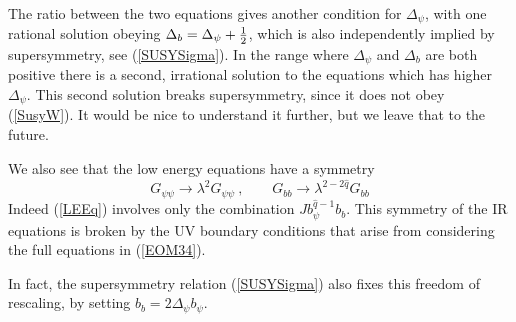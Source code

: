 \documentclass[aps,pre,preprint,onecolumn,citeautoscript,superscriptaddress,nofootinbib,eqsecnum]{revtex4-1}
\def\nref#1{(\ref{#1})}
\def\be{\begin{equation}}
\def\ee{\end{equation}}
\def\half{{1 \over 2 }}
\def\la{\label}
\begin{document}
The ratio between the two equations gives another condition for $\Delta_\psi$, with one rational
solution obeying $\Delta_b = \Delta_\psi + \half $, which is also independently implied by supersymmetry, see  \nref{SUSYSigma}. 
In the range where $\Delta_\psi$ and $\Delta_b$ are both positive there is a second, irrational solution to the equations which has 
higher $\Delta_\psi$. This second solution breaks supersymmetry, since it does not obey \nref{SusyW}. It would be nice to understand it further, but we leave that to the future. 

We also see that the low energy  equations have a symmetry 
\be \la{symNai} 
G_{\psi \psi} \to \lambda^2  G_{\psi \psi} ~,~~~~~~~~~G_{bb} \to \lambda^{ 2 - 2 \hat q }  G_{bb}
\ee
Indeed \nref{LEEq} involves  only the combination $Jb_\psi^{\hat q -1} b_b$. This symmetry of the IR equations is 
broken by the UV boundary conditions that arise from considering the full equations in \nref{EOM34}. 

In fact, the supersymmetry relation \nref{SUSYSigma} also 
fixes this freedom of rescaling, by setting $b_b = 2 \Delta_\psi b_\psi$. 
  
\end{document}
